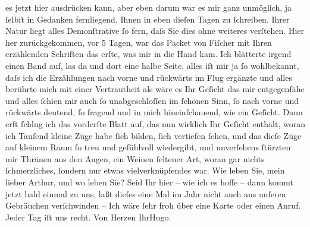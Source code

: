 \begin{ledgroupsized}[t]{13cm}
               es jetzt hier ausdrücken kann, aber eben darum war es mir ganz {\pb}unmöglich, ja ſelbſt in Gedanken fernliegend, Ihnen in
               eben dieſen Tagen zu ſchreiben. Ihrer Natur liegt alles Demonſtrative ſo fern, daſs
               Sie dies ohne weiteres verſtehen.\pend
           \pstart
           Hier her zurückgekommen, vor 5 Tagen, war das Packet von Fiſcher mit Ihren erzählenden
                  Schriften das erſte, was mir in die Hand kam. Ich blätterte irgend einen Band
               auf, las da und dort eine halbe Seite, alles iſt mir ja ſo wohlbekannt, daſs ich die
               Erzählungen nach vorne und rückwärts im Flug ergänzte und alles berührte mich mit
               einer Vertrautheit als wäre es Ihr Geſicht das mir entgegenſähe und alles ſchien mir
               auch ſo unabgeschloſſen im ſchönen Sinn, ſo nach vorne und rückwärts deutend, ſo
               fragend und in mich hineinſchauend, wie ein Geſicht. Dann erſt ſchlug ich das
               vorderſte Blatt auf, das nun wirklich Ihr Geſicht enthält, woran ich Tauſend kleine Züge habe ſich
               bilden, ſich vertiefen ſehen, und das dieſe Züge auf kleinem Raum ſo treu und
               gefühlvoll wiedergibt, und unverſehens ſtürzten mir {\pb}Thränen aus den Augen, ein Weinen ſeltener Art, woran gar nichts ſchmerzliches,
               ſondern nur etwas vielverknüpfendes war.\pend
           \pstart
           Wie leben Sie, mein lieber Arthur, und wo leben Sie? Seid Ihr hier – wie ich es hoffe
               – dann kommt jetzt bald einmal zu uns, laßt dieſes eine Mal im Jahr nicht auch aus
               unſeren Gebräuchen verſchwinden – \pend
           \pstart
           Ich wäre ſehr froh über eine Karte oder einen Anruf. Jeder Tag iſt uns recht.\pend
           \pstart Von Herzen Ihr\spacefill\mbox{Hugo.}\pend{}
         
         \endnumbering{}\end{ledgroupsized}  \newcommand{\dateiname}{L02074}\newcommand{\titel}{Hugo von Hofmannsthal an Arthur Schnitzler, 12. 6. 1912}\newcommand{\editorInnen}{Martin Anton Müller und Gerd-Hermann Susen}
      